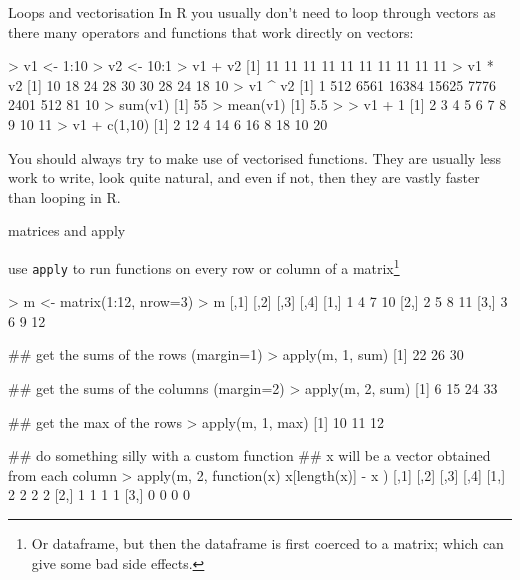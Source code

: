 \documentclass[pdf]{beamer}
\begin{document}
\begin{frame}[fragile]{Loops and vectorisation}
  In R you usually don't need to loop through vectors as there many operators
  and functions that work directly on vectors:

  \begin{rcode}
    > v1 <- 1:10
    > v2 <- 10:1
    > v1 + v2
    [1] 11 11 11 11 11 11 11 11 11 11
    > v1 * v2
    [1] 10 18 24 28 30 30 28 24 18 10
    > v1 ^ v2
    [1]     1   512  6561 16384 15625  7776  2401   512    81    10
    > sum(v1)
    [1] 55
    > mean(v1)
    [1] 5.5
    > 
    > v1 + 1
    [1]  2  3  4  5  6  7  8  9 10 11
    > v1 + c(1,10)
    [1]  2 12  4 14  6 16  8 18 10 20
  \end{rcode}
  
  You should always try to make use of vectorised functions. They are usually
  less work to write, look quite natural, and even if not, then they are
  vastly faster than looping in R.
\end{frame}

\begin{frame}[fragile]{matrices and apply}
  
  {\small
  use \texttt{apply} to run functions on every row or column
  of a matrix\footnote{Or dataframe, but then the dataframe is first
  coerced to a matrix; which can give some bad side effects.}
  }
  \begin{rcode}
    > m <- matrix(1:12, nrow=3)
    > m
    [,1] [,2] [,3] [,4]
    [1,]    1    4    7   10
    [2,]    2    5    8   11
    [3,]    3    6    9   12
    
    ## get the sums of the rows (margin=1)
    > apply(m, 1, sum)
    [1] 22 26 30
    
    ## get the sums of the columns (margin=2)
    > apply(m, 2, sum)
    [1]  6 15 24 33
    
    ## get the max of the rows
    > apply(m, 1, max)
    [1] 10 11 12
    
    ## do something silly with a custom function
    ## x will be a vector obtained from each column
    > apply(m, 2, function(x){ x[length(x)] - x })
        [,1] [,2] [,3] [,4]
    [1,]    2    2    2    2
    [2,]    1    1    1    1
    [3,]    0    0    0    0
  \end{rcode}
\end{frame}
\end{document}
